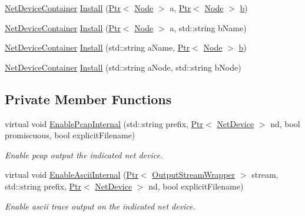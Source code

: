\begin{DoxyCompactItemize}
\hyperlink{classns3_1_1NetDeviceContainer}{Net\+Device\+Container} \hyperlink{classns3_1_1PointToPointHelper_aecfc3e7bc34a5fa9707b26df08ef913a}{Install} (\hyperlink{classns3_1_1Ptr}{Ptr}$<$ \hyperlink{classns3_1_1Node}{Node} $>$ a, \hyperlink{classns3_1_1Ptr}{Ptr}$<$ \hyperlink{classns3_1_1Node}{Node} $>$ \hyperlink{lte__pathloss_8m_a21ad0bd836b90d08f4cf640b4c298e7c}{b})
\item 
\hyperlink{classns3_1_1NetDeviceContainer}{Net\+Device\+Container} \hyperlink{classns3_1_1PointToPointHelper_aacdd0082d28133831bab1484f37b9514}{Install} (\hyperlink{classns3_1_1Ptr}{Ptr}$<$ \hyperlink{classns3_1_1Node}{Node} $>$ a, std\+::string b\+Name)
\item 
\hyperlink{classns3_1_1NetDeviceContainer}{Net\+Device\+Container} \hyperlink{classns3_1_1PointToPointHelper_a0074be81c1506a6c366e8162da0eedf0}{Install} (std\+::string a\+Name, \hyperlink{classns3_1_1Ptr}{Ptr}$<$ \hyperlink{classns3_1_1Node}{Node} $>$ \hyperlink{lte__pathloss_8m_a21ad0bd836b90d08f4cf640b4c298e7c}{b})
\item 
\hyperlink{classns3_1_1NetDeviceContainer}{Net\+Device\+Container} \hyperlink{classns3_1_1PointToPointHelper_a767d84c3e257d67c7ca54da8e0cacabe}{Install} (std\+::string a\+Node, std\+::string b\+Node)
\end{DoxyCompactItemize}
\subsection*{Private Member Functions}
\begin{DoxyCompactItemize}
\item 
virtual void \hyperlink{classns3_1_1PointToPointHelper_abe3ce49bfc07a9d40cead59b508b9c3e}{Enable\+Pcap\+Internal} (std\+::string prefix, \hyperlink{classns3_1_1Ptr}{Ptr}$<$ \hyperlink{classns3_1_1NetDevice}{Net\+Device} $>$ nd, bool promiscuous, bool explicit\+Filename)
\begin{DoxyCompactList}\small\item\em Enable pcap output the indicated net device. \end{DoxyCompactList}\item 
virtual void \hyperlink{classns3_1_1PointToPointHelper_a500491e31095208060544b015d1112d5}{Enable\+Ascii\+Internal} (\hyperlink{classns3_1_1Ptr}{Ptr}$<$ \hyperlink{classns3_1_1OutputStreamWrapper}{Output\+Stream\+Wrapper} $>$ stream, std\+::string prefix, \hyperlink{classns3_1_1Ptr}{Ptr}$<$ \hyperlink{classns3_1_1NetDevice}{Net\+Device} $>$ nd, bool explicit\+Filename)
\begin{DoxyCompactList}\small\item\em Enable ascii trace output on the indicated net device. \end{DoxyCompactList}\end{DoxyCompactItemize}
